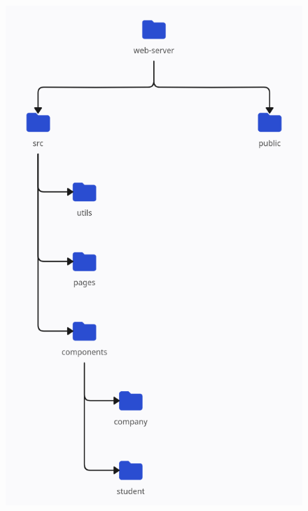 \begin{figure}[H]
    \centering
    \includegraphics[width=0.5\linewidth]{../assets/folder-tree/web-server.png}
\end{figure}

